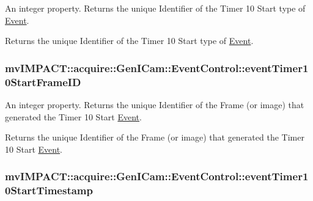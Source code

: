 An integer property. Returns the unique Identifier of the Timer 10 Start type of \hyperlink{classmv_i_m_p_a_c_t_1_1acquire_1_1_event}{Event}. 

Returns the unique Identifier of the Timer 10 Start type of \hyperlink{classmv_i_m_p_a_c_t_1_1acquire_1_1_event}{Event}. \hypertarget{classmv_i_m_p_a_c_t_1_1acquire_1_1_gen_i_cam_1_1_event_control_a1dd06fb5d0496135fca75dce34f12735}{
\subsubsection[{event\+Timer10\+Start\+Frame\+I\+D}]{ mv\+I\+M\+P\+A\+C\+T\+::acquire\+::\+Gen\+I\+Cam\+::\+Event\+Control\+::event\+Timer10\+Start\+Frame\+I\+D}}\label{classmv_i_m_p_a_c_t_1_1acquire_1_1_gen_i_cam_1_1_event_control_a1dd06fb5d0496135fca75dce34f12735}


An integer property. Returns the unique Identifier of the Frame (or image) that generated the Timer 10 Start \hyperlink{classmv_i_m_p_a_c_t_1_1acquire_1_1_event}{Event}. 

Returns the unique Identifier of the Frame (or image) that generated the Timer 10 Start \hyperlink{classmv_i_m_p_a_c_t_1_1acquire_1_1_event}{Event}. \hypertarget{classmv_i_m_p_a_c_t_1_1acquire_1_1_gen_i_cam_1_1_event_control_ab7030e0561db695fa72adb2b3b3ac74a}{
\subsubsection[{event\+Timer10\+Start\+Timestamp}]{ mv\+I\+M\+P\+A\+C\+T\+::acquire\+::\+Gen\+I\+Cam\+::\+Event\+Control\+::event\+Timer10\+Start\+Timestamp}}\label{classmv_i_m_p_a_c_t_1_1acquire_1_1_gen_i_cam_1_1_event_control_ab7030e0561db695fa72adb2b3b3ac74a}


